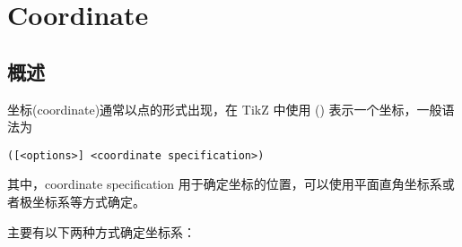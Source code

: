\section{Coordinate}
\subsection{概述}

坐标(coordinate)通常以点的形式出现，在 TikZ 中使用 () 表示一个坐标，一般语法为 

\begin{lstlisting}[style = latex]
    ([<options>] <coordinate specification>)
\end{lstlisting}
其中，coordinate specification 用于确定坐标的位置，可以使用平面直角坐标系或者极坐标系等方式确定。

主要有以下两种方式确定坐标系：
